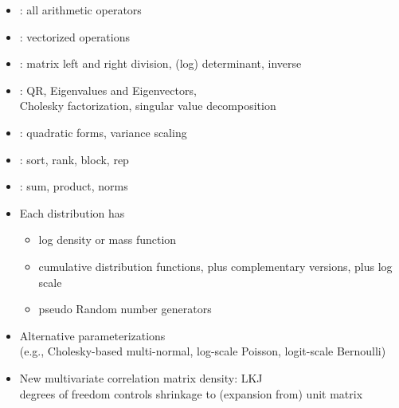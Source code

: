 \documentclass[10pt]{report}
\newcommand{\sld}[1]{\newpage{\noindent\LARGE \ \ \
    \textcolor{MidnightBlue}{\bfseries #1}}\vspace*{4pt}}
\newcommand{\myemph}[1]{{\color{MidnightBlue}{\bfseries #1}}}
\begin{document}
\sld{Built-in Matrix Functions}

\begin{itemize}
\item \myemph{Basic arithmetic}: all arithmetic operators
\item \myemph{Elementwise arithmetic}: vectorized operations
\item \myemph{Solvers}: matrix left and right division, (log) determinant,
inverse 
\item \myemph{Decompositions}: QR, Eigenvalues and Eigenvectors, 
\\
Cholesky factorization, singular value decomposition
\item \myemph{Compound Operations}: quadratic forms, variance scaling
\vfill
\item \myemph{Ordering, Slicing, Broadcasting}: sort, rank, block, rep
\item \myemph{Reductions}: sum, product, norms
\end{itemize}

\sld{Distribution Library}

\begin{itemize}
\item Each distribution has
\vspace*{-4pt}
\begin{itemize}\small
\item log density or mass function
\item cumulative distribution functions, plus complementary versions,
  plus log scale
\item pseudo Random number generators
\end{itemize}
\item Alternative parameterizations
\\
{\footnotesize (e.g., Cholesky-based multi-normal,
log-scale Poisson, logit-scale Bernoulli)}
\item New multivariate correlation matrix density: LKJ
\\
{\footnotesize degrees of freedom controls 
shrinkage to (expansion from) unit matrix}
\end{itemize}

\sld{Statements}
\end{document}
